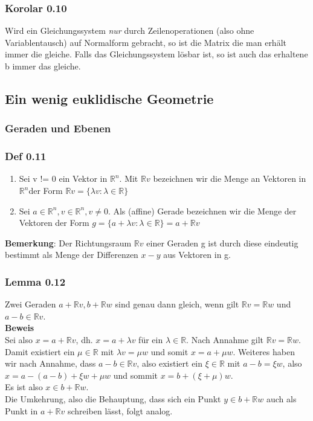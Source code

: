 \documentclass{article}
\newcommand{\lb}{\lambda}
\newcommand{\R}{\mathbb{R}}
\newcommand{\Rn}{\mathbb{R}^n}
\newcommand{\mRn}{$\mathbb{R}^n$}
\begin{document}
\subsubsection{Korolar 0.10}
Wird ein Gleichungssystem \textit{nur} durch Zeilenoperationen (also ohne Variablentausch) auf Normalform gebracht, so ist die Matrix die man erhält immer die gleiche. Falls das Gleichungssystem lösbar ist, so ist auch das erhaltene b immer das gleiche.

\subsection{Ein wenig euklidische Geometrie}

\subsubsection{Geraden und Ebenen}
\subsubsection{Def 0.11}
\begin{enumerate}
\item{
Sei v != 0 ein Vektor in \mRn. Mit $\R v$ bezeichnen wir die Menge an Vektoren in \mRn der Form $\R v = \{\lb v : \lb \in \R\}$}
\item{
Sei $a \in \Rn, v \in \Rn, v \neq 0$. Als (affine) Gerade bezeichnen wir die Menge der Vektoren der Form $g = \{a + \lb v : \lb \in \R\} = a + \R v$
}
\end{enumerate}
\textbf{Bemerkung}: Der Richtungsraum $\R v$ einer Geraden g ist durch diese eindeutig bestimmt als Menge der Differenzen $x - y$ aus Vektoren in g.\\

\subsubsection{Lemma 0.12}
Zwei Geraden $a + \R v, b + \R w$ sind genau dann gleich, wenn gilt $\R v = \R w$ und $a - b \in \R v$.\\
\textbf{Beweis}\\
Sei also  $x = a + \R v$, dh. $x = a + \lb v$ für ein $\lb \in \R$. Nach Annahme gilt $\R v = \R w$. Damit existiert ein $\mu \in \R$ mit $\lb v = \mu w$ und somit $x = a + \mu w$. Weiteres haben wir nach Annahme, dass $a-b \in \R v$, also existiert ein $\xi \in \R$ mit $a - b = \xi w$, also $x = a - (a - b) + \xi w + \mu w$ und sommit $x = b + (\xi + \mu) w$.\\
Es ist also $x \in b + \R w$.\\
Die Umkehrung, also die Behauptung, dass sich ein Punkt $y \in b + \R w$ auch als Punkt in $a + \R v$ schreiben lässt, folgt analog.\\
\end{document}
